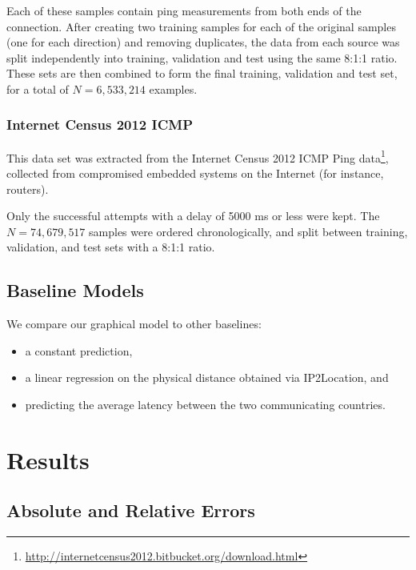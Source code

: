 \documentclass[10pt,a4paper,notitlepage,twocolumn]{article}
\begin{document}
Each of these samples contain ping measurements from both ends of the
connection. After creating two training samples for each of the original
samples (one for each direction) and removing duplicates, the data from
each source was split independently into training, validation and test
using the same 8:1:1 ratio. These sets are then combined to form the
final training, validation and test set, for a total of $N=6,533,214$
examples.

\subsubsection{Internet Census 2012 ICMP}

This data set was extracted from the Internet Census 2012 ICMP Ping
data\footnote{\url{http://internetcensus2012.bitbucket.org/download.html}},
collected from compromised embedded systems on the Internet (for
instance, routers).

Only the successful attempts with a delay of 5000 ms or less were kept.
The $N=74,679,517$ samples were ordered chronologically, and split
between training, validation, and test sets with a 8:1:1 ratio.

\subsection{Baseline Models}

We compare our graphical model to other baselines:
\begin{itemize}
  \item a constant prediction,
  \item a linear regression on the physical distance obtained
via IP2Location, and
  \item predicting the average latency between the two
communicating countries.
\end{itemize}


\section{Results}

\subsection{Absolute and Relative Errors}
\end{document}
